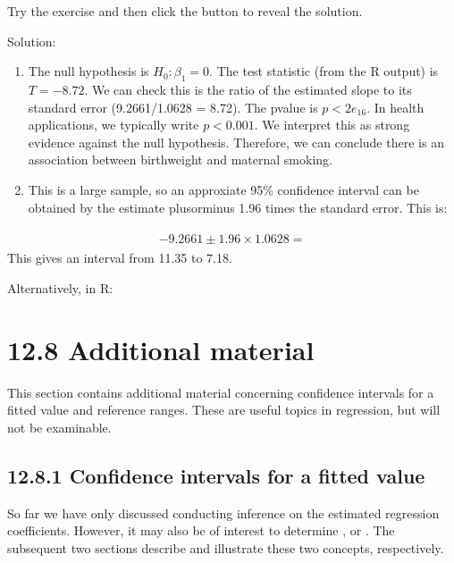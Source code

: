 \documentclass[letterpaper,10pt,english]{jupyterBook}
\begin{document}
\sphinxAtStartPar
Try the exercise and then click the button to reveal the solution.

\sphinxAtStartPar
Solution:
\begin{enumerate}
%
\item {} 
\sphinxAtStartPar
The null hypothesis is \(H_0: \beta_1 = 0\). The test statistic (from the R output) is \(T=-8.72\). We can check this is the ratio of the estimated slope to its standard error (\sphinxhyphen{}9.2661/1.0628 = \sphinxhyphen{}8.72). The p\sphinxhyphen{}value is \(p<2e_16\). In health applications, we typically write \(p<0.001\). We interpret this as strong evidence against the null hypothesis. Therefore, we can conclude there is an association between birthweight and maternal smoking.

\item {} 
\sphinxAtStartPar
This is a large sample, so an approxiate 95\% confidence interval can be obtained by the estimate plus\sphinxhyphen{}or\sphinxhyphen{}minus 1.96 times the standard error. This is:

\end{enumerate}
\begin{equation*}
\begin{split}
\begin{align*}
-9.2661 \pm 1.96 \times 1.0628  = 
\end{align*}
\end{split}
\end{equation*}
\sphinxAtStartPar
This gives an interval from \sphinxhyphen{}11.35 to \sphinxhyphen{}7.18.

\sphinxAtStartPar
Alternatively, in R:  


\section{12.8 Additional material}
\label{\detokenize{12.i. Linear Regression I:additional-material}}\label{\detokenize{12.i. Linear Regression I::doc}}
\sphinxAtStartPar
This section contains additional material concerning confidence intervals for a fitted value and reference ranges. These are useful topics in regression, but will not be examinable.


\subsection{12.8.1 Confidence intervals for a fitted value}
\label{\detokenize{12.i. Linear Regression I:confidence-intervals-for-a-fitted-value}}
\sphinxAtStartPar
So far we have only discussed conducting inference on the estimated regression coefficients. However, it may also be of interest to determine , or . The subsequent two sections describe and illustrate these two concepts, respectively.
\end{document}
